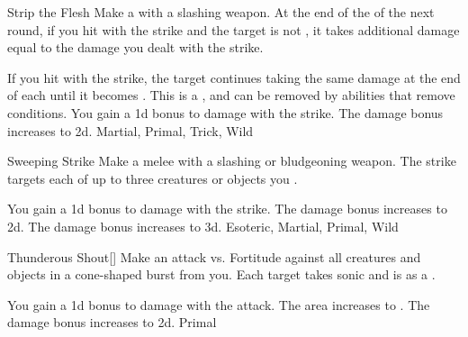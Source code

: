 \lowercase{\hypertarget{maneuver:Strip the Flesh}{}}\label{maneuver:Strip the Flesh}
\hypertarget{maneuver:Strip the Flesh}{}
\begin{apability}{Strip the Flesh}
Make a  with a slashing weapon.
At the end of the  of the next round,
if you hit with the strike and the target is not ,
it takes additional damage equal to the damage you dealt with the strike.

\rankline
{} If you hit with the strike, the target continues taking the same damage
at the end of each  until it becomes .
This is a , and can be removed by abilities that remove conditions.
 You gain a \plus1d bonus to damage with the strike.
 The damage bonus increases to \plus2d.
 Martial, Primal, Trick, Wild
\end{apability}
\vspace{0.25em}



\lowercase{\hypertarget{maneuver:Sweeping Strike}{}}\label{maneuver:Sweeping Strike}
\hypertarget{maneuver:Sweeping Strike}{}
\begin{apability}{Sweeping Strike}
Make a melee  with a slashing or bludgeoning weapon.
The strike targets each of up to three creatures or objects you .

\rankline
{} You gain a \plus1d bonus to damage with the strike.
 The damage bonus increases to \plus2d.
 The damage bonus increases to \plus3d.
 Esoteric, Martial, Primal, Wild
\end{apability}
\vspace{0.25em}



\lowercase{\hypertarget{maneuver:Thunderous Shout}{}}\label{maneuver:Thunderous Shout}
\hypertarget{maneuver:Thunderous Shout}{}
\begin{apability}{Thunderous Shout}[]
Make an attack vs. Fortitude against all creatures and objects in a \areamed cone-shaped burst from you.
\hit Each target takes sonic  and is  as a .

\rankline
{} You gain a \plus1d bonus to damage with the attack.
 The area increases to \arealarge.
 The damage bonus increases to \plus2d.
 Primal
\end{apability}
\vspace{0.25em}




